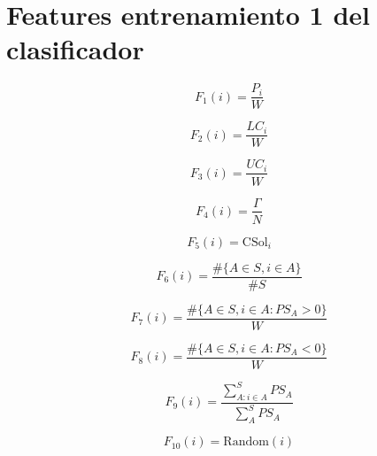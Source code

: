 \documentclass[spanish, a4paper, 12pt, twoside, openany,final]{book}
\numberwithin{equation}{section}
\begin{document}
\section*{Features entrenamiento 1 del clasificador}
\begin{multicols}{2}
	
	
	\begin{equation}
		F_1\left(i\right)   = \frac{P_i}{W}
		\label{feature:1}
	\end{equation}
	
	\begin{equation}
		F_2\left(i\right)   = \frac{LC_i}{W}
		\label{feature:2}
	\end{equation}
	
	\begin{equation}
		F_3\left(i\right)   = \frac{UC_i}{W}
		\label{feature:3}
	\end{equation}
	
	\begin{equation}
		F_4\left(i\right)   = \frac{\Gamma}{N}
		\label{feature:4}
	\end{equation}
	
	\begin{equation}
		F_5\left(i\right)   = \text{CSol}_i
		\label{feature:5}
	\end{equation}
	
	\begin{equation}
		F_6\left(i\right)   = \frac{\#\{A\in S,i \in A \}}{\#S}
		\label{feature:6}
	\end{equation}
	
	\begin{equation}
		F_7\left(i\right)   = \frac{\#\{A\in S,i \in A: PS_A > 0 \}}{W}
		\label{feature:7}
	\end{equation}
	
	\begin{equation}
		F_8\left(i\right)   = \frac{\#\{A\in S,i \in A: PS_A < 0 \}}{W}
		\label{feature:8}
	\end{equation}
	
	\begin{equation}
		F_9\left(i\right)   = \frac{\sum^S_{A: i\in A} PS_{A}}{\sum^S_{A} PS_A}
		\label{feature:9}
	\end{equation}
	
	\begin{equation}
		F_10\left(i\right)   = \text{Random}\left(i\right)
		\label{feature:10}
	\end{equation}
	
\end{multicols}

\clearpage
\end{document}
